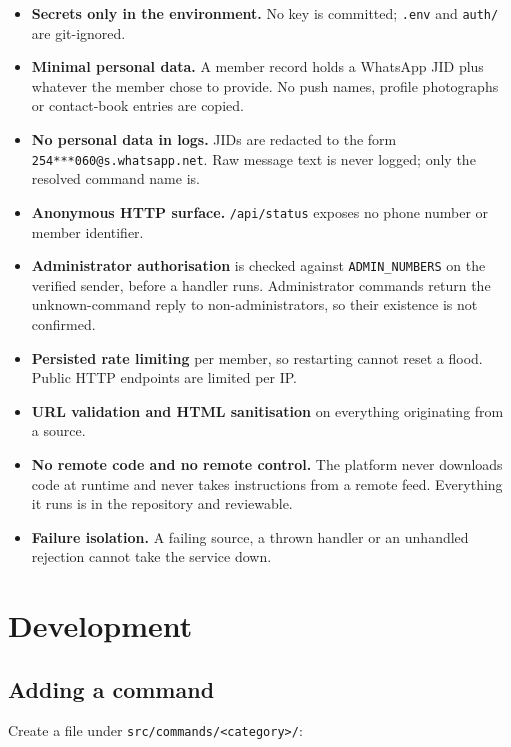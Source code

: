\documentclass[11pt,a4paper]{report}
\begin{document}
\begin{itemize}
  \item \textbf{Secrets only in the environment.} No key is committed;
        \texttt{.env} and \texttt{auth/} are git-ignored.
  \item \textbf{Minimal personal data.} A member record holds a WhatsApp JID
        plus whatever the member chose to provide. No push names, profile
        photographs or contact-book entries are copied.
  \item \textbf{No personal data in logs.} JIDs are redacted to the form
        \texttt{254***060@s.whatsapp.net}. Raw message text is never logged;
        only the resolved command name is.
  \item \textbf{Anonymous HTTP surface.} \texttt{/api/status} exposes no phone
        number or member identifier.
  \item \textbf{Administrator authorisation} is checked against
        \texttt{ADMIN\_NUMBERS} on the verified sender, before a handler runs.
        Administrator commands return the unknown-command reply to
        non-administrators, so their existence is not confirmed.
  \item \textbf{Persisted rate limiting} per member, so restarting cannot reset
        a flood. Public HTTP endpoints are limited per IP.
  \item \textbf{URL validation and HTML sanitisation} on everything originating
        from a source.
  \item \textbf{No remote code and no remote control.} The platform never
        downloads code at runtime and never takes instructions from a remote
        feed. Everything it runs is in the repository and reviewable.
  \item \textbf{Failure isolation.} A failing source, a thrown handler or an
        unhandled rejection cannot take the service down.
\end{itemize}

\chapter{Development}

\section{Adding a command}

Create a file under \texttt{src/commands/<category>/}:
\end{document}
